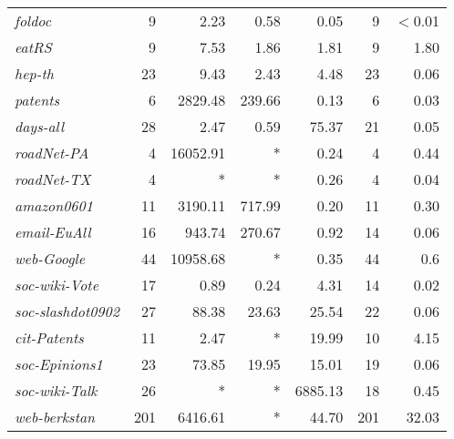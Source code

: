 \begin{table}[!hbt]
\begin{tabular}{lr|rrr|rr}
{\it foldoc}	&	9	&	2.23	&	0.58	&	0.05	&	9	&	$<$0.01	\\
{\it eatRS}	&	9	&	7.53	&	1.86	&	1.81	&	9	&	1.80	\\
{\it hep-th}	&	23	&	9.43	&	2.43	&	4.48	&	23	&	0.06	\\
{\it patents}	&	6	&	2829.48	&	239.66	&	0.13	&	6	&	0.03	\\
{\it days-all}	&	28	&	2.47	&	0.59	&	75.37	&	21	&	0.05	\\
{\it roadNet-PA}	&	4	&	16052.91	&	*	&	0.24	&	4	&	0.44	\\
{\it roadNet-TX}	&	4	&	*	&	*	&	0.26	&	4	&	0.04	\\
{\it amazon0601}	&	11	&	3190.11	&	717.99	&	0.20	&	11	&	0.30	\\
{\it email-EuAll}	&	16	&	943.74	&	270.67	&	0.92	&	14	&	0.06	\\
{\it web-Google}	&	44	&	10958.68	&	*	&	0.35	&	44	&	0.6	\\
{\it soc-wiki-Vote}	&	17	&	0.89	&	0.24	&	4.31	&	14	&	0.02	\\
{\it soc-slashdot0902}	&	27	&	88.38	&	23.63	&	25.54	&	22	&	0.06	\\
{\it cit-Patents}	&	11	&	2.47	&	*	&	19.99	&	10	&	4.15	\\
{\it soc-Epinions1}	&	23	&	73.85	&	19.95	&	15.01	&	19	&	0.06	\\
{\it soc-wiki-Talk}	&	26	&	*	&	*	&	6885.13	&	18	&	0.45	\\
{\it web-berkstan}	&	201	&	6416.61	&	*	&	44.70	&	201	&	32.03	\\
	\bottomrule\bottomrule
\end{tabular}
\end{table}
